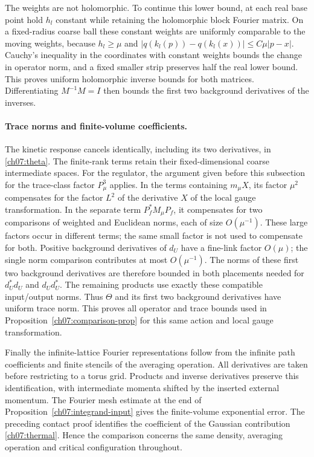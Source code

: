 The weights are not holomorphic. To continue this lower bound, at each real
base point hold $h_l$ constant while retaining the holomorphic block Fourier
matrix. On a fixed-radius coarse ball these constant weights are uniformly
comparable to the moving weights, because $h_l\ge\mu$ and
$|q(k_l(p))-q(k_l(x))|\le C\mu|p-x|$.
Cauchy's inequality in the coordinates with constant weights bounds the change in
operator norm, and a fixed smaller strip preserves half the real lower bound.
This proves uniform holomorphic inverse bounds for both matrices.
Differentiating $M^{-1}M=I$ then bounds the first two background derivatives of the inverses.

\paragraph{Trace norms and finite-volume coefficients.}
The kinetic response cancels identically, including its two derivatives,
in \eqref{ch07:theta}. The finite-rank terms retain their fixed-dimensional
coarse intermediate spaces. For the regulator, the argument given before this
subsection for the trace-class factor $P_\mu^3$ applies. In the terms containing
$m_\mu X$, its factor $\mu^2$ compensates for the factor $L^2$ of the derivative $X$ of the local gauge transformation.
In the separate term $P_f^*M_\mu P_f$, it compensates for two comparisons of weighted and Euclidean
norms, each of size $O(\mu^{-1})$. These large factors occur in
different terms; the same small factor is not used to compensate for both. Positive background derivatives of $d_U$ have a fine-link factor
$O(\mu)$; the single norm comparison contributes at most $O(\mu^{-1})$.
The norms of these first two background derivatives are therefore bounded in both
placements needed for $d_U^*d_U$ and $d_Ud_U^*$. The remaining
products use exactly these compatible input/output norms. Thus
$\Theta$ and its first two background derivatives have uniform trace norm. This proves all operator and trace bounds used in
Proposition~\ref{ch07:comparison-prop} for this same action and local gauge transformation.

Finally the infinite-lattice Fourier representations follow from the infinite
path coefficients and finite stencils of the averaging operation. All derivatives are
taken before restricting to a torus grid. Products and inverse derivatives
preserve this identification, with intermediate momenta shifted by the
inserted external momentum. The Fourier mesh estimate at the end of
Proposition~\ref{ch07:integrand-input} gives the finite-volume exponential
error. The preceding contact proof identifies the coefficient of
the Gaussian contribution \eqref{ch07:thermal}. Hence the comparison concerns the same density,
averaging operation and critical configuration throughout.


